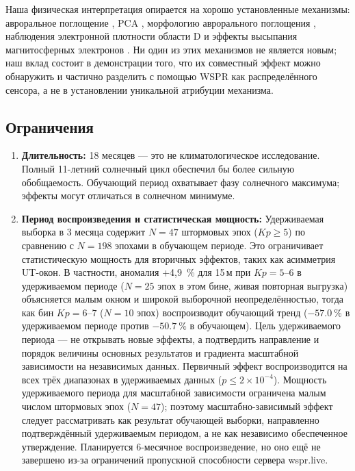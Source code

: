 \documentclass{agujournal2019}
\begin{document}
Наша физическая интерпретация опирается на хорошо установленные механизмы:
авроральное поглощение \citep{hargreaves1969}, PCA \citep{reid1974},
морфологию аврорального поглощения \citep{royrvik1977}, наблюдения
электронной плотности области D \citep{kavanagh2004} и эффекты высыпания
магнитосферных электронов \citep{rodger2010}. Ни один из этих механизмов
не является новым; наш вклад состоит в демонстрации того, что их совместный
эффект можно обнаружить и частично разделить с помощью WSPR как
распределённого сенсора, а не в установлении уникальной атрибуции
механизма.

\subsection{Ограничения}

\begin{enumerate}
	\item \textbf{Длительность:} 18 месяцев — это не климатологическое
	      исследование. Полный 11-летний солнечный цикл обеспечил бы более
	      сильную обобщаемость. Обучающий период охватывает фазу
	      солнечного максимума; эффекты могут отличаться в солнечном
	      минимуме.
	\item \textbf{Период воспроизведения и статистическая мощность:}
	      Удерживаемая выборка в 3 месяца содержит $N = 47$ штормовых эпох
	      ($Kp \ge 5$) по сравнению с $N = 198$ эпохами в обучающем
	      периоде. Это ограничивает статистическую мощность для вторичных
	      эффектов, таких как асимметрия UT-окон. В частности, аномалия
	      +4,9~\% для 15\,м при $Kp = 5\text{--}6$ в удерживаемом периоде
	      ($N = 25$ эпох в этом бине, живая повторная выгрузка) объясняется
	      малым окном и широкой выборочной неопределённостью, тогда как бин
	      $Kp = 6\text{--}7$ ($N = 10$ эпох) воспроизводит обучающий
	      тренд ($\SI{-57.0}{\percent}$ в удерживаемом периоде против
	      $\SI{-50.7}{\percent}$ в обучающем). Цель удерживаемого периода —
	      не открывать новые эффекты, а подтвердить направление и порядок
	      величины основных результатов и градиента масштабной зависимости
	      на независимых данных. Первичный эффект воспроизводится на всех
	      трёх диапазонах в удерживаемых данных ($p \le 2 \times 10^{-4}$).
	      Мощность удерживаемого периода для масштабной зависимости ограничена
	      малым числом штормовых эпох ($N = 47$); поэтому
	      масштабно-зависимый эффект следует рассматривать как результат
	      обучающей выборки, направленно подтверждённый удерживаемым
	      периодом, а не как независимо обеспеченное утверждение.
	      Планируется 6-месячное воспроизведение, но оно ещё не завершено
	      из-за ограничений пропускной способности сервера wspr.live.


\end{enumerate}
\end{document}
